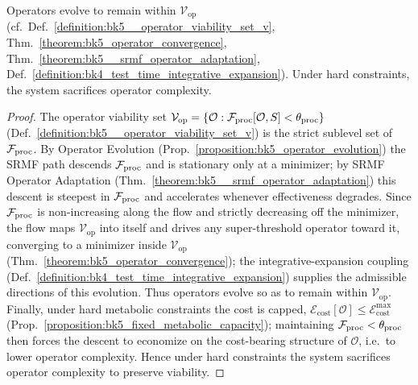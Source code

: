 \begin{proposition}
\label{proposition:bk5_operators_evolve}
\leavevmode\newline
Operators evolve to remain within $\mathcal{V}_{\text{op}}$
(cf.~Def.~\ref{definition:bk5__operator_viability_set_v},
Thm.~\ref{theorem:bk5_operator_convergence},
Thm.~\ref{theorem:bk5__srmf_operator_adaptation},
Def.~\ref{definition:bk4_test_time_integrative_expansion}).
Under hard constraints, the system sacrifices operator complexity.
\end{proposition}
\begin{proof}
\label{proof:bk5_operators_evolve}
\leavevmode
The operator viability set $\mathcal{V}_{\text{op}}=\{\mathcal{O}:\mathcal{F}_{\text{proc}}[\mathcal{O},S]<\theta_{\text{proc}}\}$ (Def.~\ref{definition:bk5__operator_viability_set_v}) is the strict sublevel set of $\mathcal{F}_{\text{proc}}$. By Operator Evolution (Prop.~\ref{proposition:bk5_operator_evolution}) the SRMF path descends $\mathcal{F}_{\text{proc}}$ and is stationary only at a minimizer; by SRMF Operator Adaptation (Thm.~\ref{theorem:bk5__srmf_operator_adaptation}) this descent is steepest in $\mathcal{F}_{\text{proc}}$ and accelerates whenever effectiveness degrades. Since $\mathcal{F}_{\text{proc}}$ is non-increasing along the flow and strictly decreasing off the minimizer, the flow maps $\mathcal{V}_{\text{op}}$ into itself and drives any super-threshold operator toward it, converging to a minimizer inside $\mathcal{V}_{\text{op}}$ (Thm.~\ref{theorem:bk5_operator_convergence}); the integrative-expansion coupling (Def.~\ref{definition:bk4_test_time_integrative_expansion}) supplies the admissible directions of this evolution. Thus operators evolve so as to remain within $\mathcal{V}_{\text{op}}$. Finally, under hard metabolic constraints the cost is capped, $\mathcal{E}_{\text{cost}}[\mathcal{O}]\le\mathcal{E}_{\text{cost}}^{\max}$ (Prop.~\ref{proposition:bk5_fixed_metabolic_capacity}); maintaining $\mathcal{F}_{\text{proc}}<\theta_{\text{proc}}$ then forces the descent to economize on the cost-bearing structure of $\mathcal{O}$, i.e.\ to lower operator complexity. Hence under hard constraints the system sacrifices operator complexity to preserve viability.
\end{proof}
